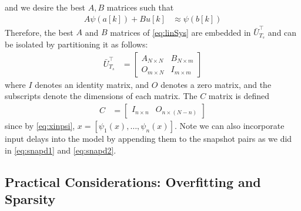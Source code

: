 and we desire the best $A,B$ matrices such that
\begin{align}
    A \psi(a[k]) + B u[k] &\approx \psi(b[k])
    \label{eq:linSys_psi}
\end{align}
Therefore, the best $A$ and $B$ matrices of \eqref{eq:linSys} are embedded in $\bar{U}_{T_s}^\top$ and can be isolated by partitioning it as follows:
\begin{align}
    \bar{U}_{T_s}^\top &= 
    \begin{bmatrix} 
        A_{N \times N} &
        B_{N \times m} \\
        O_{m \times N} &
        I_{m \times m}
    \end{bmatrix}
    \label{eq:AB}
\end{align}
where $I$ denotes an identity matrix, and $O$ denotes a zero matrix, and the subscripts denote the dimensions of each matrix.
The $C$ matrix is defined
\begin{align}
    C &= \begin{bmatrix} I_{n \times n} & O_{n \times (N-n)} \end{bmatrix}
    \label{eq:C}
\end{align}
since by \eqref{eq:xinpsi}, ${x = [ \psi_1(x) , \dots , \psi_n(x) ]}$.
Note we can also incorporate input delays into the model by appending them to the snapshot pairs as we did in \eqref{eq:snapd1} and \eqref{eq:snapd2}.





\subsection{Practical Considerations: Overfitting and Sparsity} \label{subsec:sparsity}

